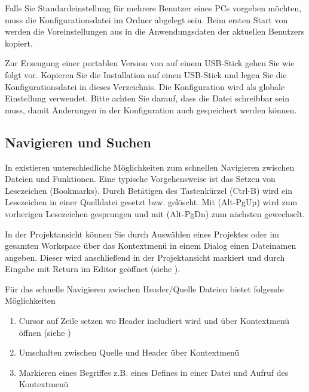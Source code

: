 Falls Sie Standardeinstellung für mehrere Benutzer eines PCs vorgeben möchten, muss die Konfigurationsdatei  im Ordner  abgelegt sein. Beim ersten Start von \codeblocks werden die Voreinstellungen aus  in die Anwendungsdaten der aktuellen Benutzers kopiert.

Zur Erzeugung einer portablen Version von \codeblocks auf einem USB-Stick gehen Sie wie folgt vor. Kopieren Sie die \codeblocks Installation auf einen USB-Stick und legen Sie die Konfigurationsdatei  in dieses Verzeichnis. Die Konfiguration wird als globale Einstellung verwendet. Bitte achten Sie darauf, dass die Datei schreibbar sein muss, damit Änderungen in der Konfiguration auch gespeichert werden können.

\subsection{Navigieren und Suchen}

In \codeblocks existieren unterschiedliche Möglichkeiten zum schnellen Navigieren zwischen Dateien und Funktionen. Eine typische Vorgehensweise ist das Setzen von Lesezeichen (Bookmarks). Durch Betätigen des Tastenkürzel (Ctrl-B) wird ein Lesezeichen in einer Quelldatei gesetzt bzw. gelöscht. Mit (Alt-PgUp) wird zum vorherigen Lesezeichen gesprungen und mit (Alt-PgDn) zum nächsten gewechselt.

In der Projektansicht können Sie durch Auswählen eines Projektes oder im gesamten Workspace über das Kontextmenü  in einem Dialog einen Dateinamen angeben. Dieser wird anschließend in der Projektansicht markiert und durch Eingabe mit Return im Editor geöffnet (siehe ).


Für das schnelle Navigieren zwischen Header/Quelle Dateien bietet \codeblocks folgende Möglichkeiten

\begin{enumerate}
\item Cursor auf Zeile setzen wo Header includiert wird und über Kontextmenü  öffnen (siehe )
\item Umschalten zwischen Quelle und Header über Kontextmenü 
\item Markieren eines Begriffes z.B. eines Defines in einer Datei und Aufruf des Kontextmenü 
\end{enumerate}

